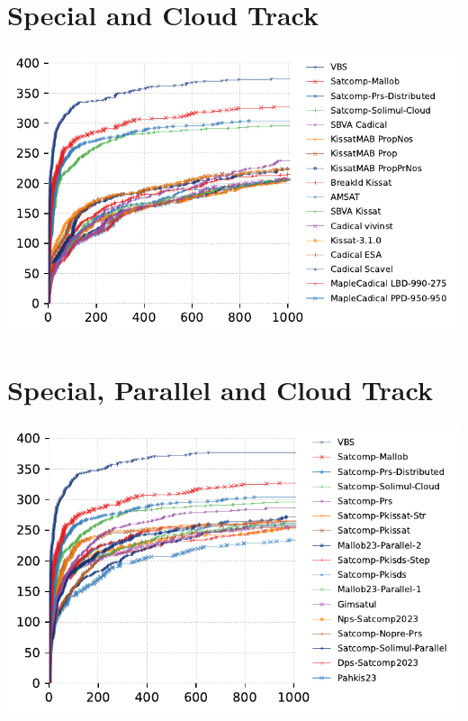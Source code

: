 \documentclass{article}
\begin{document}
\section{Special and Cloud Track}
\includegraphics[width=\linewidth]{gen/sc2023/special-cloud/cdf.pdf}



\section{Special, Parallel and Cloud Track}
\includegraphics[width=\linewidth]{gen/sc2023/special-parallel-cloud/cdf.pdf}


\end{document}
